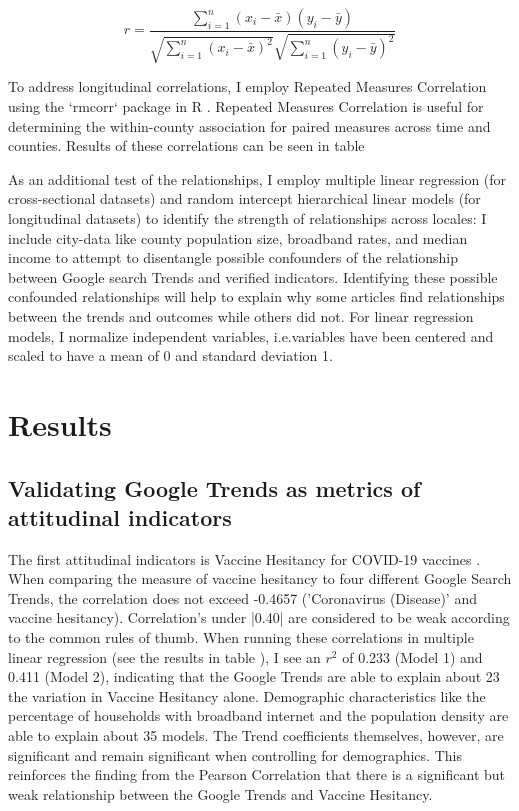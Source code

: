 \begin{equation}
 r =
  \frac{ \sum_{i=1}^{n}(x_i-\bar{x})(y_i-\bar{y}) }{
        \sqrt{\sum_{i=1}^{n}(x_i-\bar{x})^2}\sqrt{\sum_{i=1}^{n}(y_i-\bar{y})^2}} %
\end{equation}

To address longitudinal correlations, I employ Repeated Measures Correlation
using the `rmcorr` package in R \citep{bland1995, bakdash2017}. Repeated Measures
Correlation is useful for determining the within-county association for paired
measures across time and counties. Results of these correlations can be seen in 
table %

As an additional test of the relationships, I employ multiple linear regression
(for cross-sectional datasets) and random intercept hierarchical linear models
\citep{pinheiro_etal21} (for longitudinal datasets) to identify the strength of
relationships across locales: I include city-data like county population size,
broadband rates, and median income to attempt to disentangle possible
confounders of the relationship between Google search Trends and verified
indicators. Identifying these possible confounded relationships will help to
explain why some articles find relationships between the trends and outcomes
while others did not. For linear regression models, I normalize independent
variables, i.e.variables have been centered and scaled to have a mean of 0 and
standard deviation 1.

\section{Results}

\subsection{Validating Google Trends as metrics of attitudinal indicators}


The first attitudinal indicators is Vaccine Hesitancy for COVID-19 vaccines
\citep{vaches_data}. When comparing the measure of vaccine hesitancy to four
different Google Search Trends, the correlation does not exceed -0.4657
('Coronavirus (Disease)' and vaccine hesitancy). Correlation's under |0.40| are
considered to be weak according to the common rules of thumb. When running these
correlations in multiple linear regression (see the results in table
), I see an $r^2$ of 0.233 (Model 1) and 0.411
(Model 2), indicating that the Google Trends are able to explain about 23%
the variation in Vaccine Hesitancy alone. Demographic characteristics like the
percentage of households with broadband internet and the population density are
able to explain about 35%
models. The Trend coefficients themselves, however, are significant and remain
significant when controlling for demographics. This reinforces the finding from
the Pearson Correlation that there is a significant but weak relationship
between the Google Trends and Vaccine Hesitancy.

